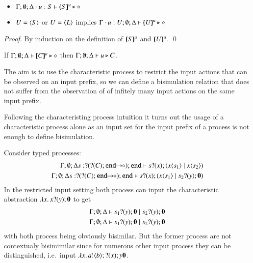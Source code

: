 \begin{proposition}\rm
$ $
	\begin{itemize}
		\item	$\Gamma; \emptyset; \Delta \cdot u:S \vdash [\!\!(S)\!\!]^{u} \triangleright \diamond$
		\item	$U = \langle S \rangle$ or $U = \langle L \rangle$ implies $\Gamma \cdot u:U; \emptyset; \Delta \vdash [\!\!(U)\!\!]^{u} \triangleright \diamond$
	\end{itemize}
\end{proposition}

\begin{proof}
	By induction on the definition of $[\!\!(S)\!\!]^{u}$ and $[\!\!(U)\!\!]^{u}$.
	\qed
\end{proof}

\begin{corollary}\rm
	If $\Gamma; \emptyset; \Delta \vdash [\!\!(C)\!\!]^{u} \triangleright \diamond$
	then
	$\Gamma; \emptyset; \Delta \vdash u \triangleright C$.
\end{corollary}

The aim is to use the characteristic process to restrict the input
actions that can be observed on an input prefix, so we can define
a bisimulation relation that does not suffer from the observation of 
of infitely many input actions on the same input prefix.

Following the characteristing process intuition it turns out
the usage of a characteristic process
alone as an input set for the input prefix of a process
is not enough to define bisimulation.

\begin{example}
	\label{ex:char_proc}
	Consider typed processes:
	\begin{eqnarray*}
		\Gamma; \es; \Delta s: \btinp{\shot{\btinp{C} \tinact}} \tinact \proves \binp{s}{x} (\appl{x}{s_1} \Par \appl{x}{s_2})\\
		\Gamma; \es; \Delta s: \btinp{\shot{\btinp{C} \tinact}} \tinact \proves \binp{s}{x} (\appl{x}{s_1} \Par \binp{s_2}{y} \inact)
	\end{eqnarray*}
	In the restricted input setting both process can input the
	characteristic abstraction $\lambda x.\,x ? (y) ; \mathbf{0}$
	to get
	\begin{eqnarray*}
		\Gamma; \emptyset; \Delta \vdash s_1 ? (y) ; \mathbf{0} \;|\; s_2 ? (y) ; \mathbf{0}\\
		\Gamma; \emptyset; \Delta \vdash s_1 ? (y) ; \mathbf{0} \;|\; s_2 ? (y) ; \mathbf{0}
	\end{eqnarray*}
	with both process being obviously bisimilar.
	But the former process are not contextualy bisimimilar since
	for numerous other input process they can be distinguished,
	i.e.~input $\lambda x.\,a ! \langle b \rangle ; ? (x) ;{y} \mathbf{0}$.
\end{example}


